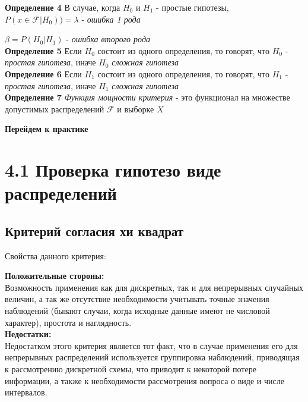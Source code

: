 \documentclass[a4paper,12pt, oneside]{book}
\begin{document}
\normalsize{\textbf{Определение 4}} В случае, когда $ H_0 $ и $ H_1 $ - простые гипотезы, $ P(x \in \mathcal{F} | H_0)) = \lambda $ - {\it ошибка 1 рода}

$ \beta = P(H_0 | H_1) $ - \textit{ошибка второго рода}\\

\normalsize{\textbf{Определение 5}} Если $ H_0 $ состоит из одного определения, то говорят, что $ H_0 $ - \textit{простая гипотеза}, иначе $ H_0 $  \textit{сложная гипотеза}\\

\normalsize{\textbf{Определение 6}} Если $ H_1 $ состоит из одного определения, то говорят, что $ H_1 $ - \textit{простая гипотеза}, иначе $ H_1 $  \textit{сложная гипотеза}\\

\normalsize{\textbf{Определение 7}} \textit{ Функция мощности критерия } - это функционал на множестве допустимых распределений  $ \mathcal{F} $  и выборке $ X $

\newpage
\begin{center}
	\textbf{\Large Перейдем к практике}
\end{center}

\chapter{4.1 Проверка гипотезо виде распределений}


\section{Критерий согласия хи квадрат}
\begin{center}
	{\large Свойства данного критерия:}
\end{center}


\textbf{Положительные стороны:}\\

Возможность применения как для дискретных, так и для непрерывных случайных величин, а так же отсутствие необходимости учитывать точные значения наблюдений (бывают случаи, когда исходные данные имеют не
числовой характер), простота и наглядность.\\

\textbf{Недостатки:}\\

Недостатком этого критерия является тот факт, что в случае применения его для непрерывных распределений используется группировка наблюдений, приводящая к рассмотрению дискретной схемы, что приводит к некоторой потере информации, а также к необходимости рассмотрения вопроса о виде и числе интервалов.
\end{document}
